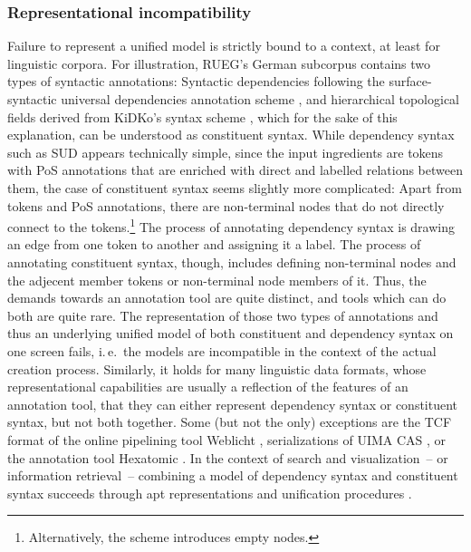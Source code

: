 \documentclass[output=paper,colorlinks,citecolor=brown]{langscibook}
\begin{document}
\subsubsection{Representational incompatibility}

Failure to represent a unified model is strictly bound to a context, at least for linguistic corpora.
For illustration, RUEG's German subcorpus contains two types of syntactic annotations: Syntactic dependencies following the surface-syntactic universal dependencies annotation scheme \parencite[SUD;][]{kahane_annotation_2021}, and hierarchical topological fields derived from KiDKo's syntax scheme \parencite{wiese2010kidko}, which for the sake of this explanation, can be understood as constituent syntax.
While dependency syntax such as SUD appears technically simple, since the input ingredients are tokens with PoS annotations that are enriched with direct and labelled relations between them,
the case of constituent syntax seems slightly more complicated: Apart from tokens and PoS annotations, there are non-terminal nodes that do not directly connect to the tokens.\footnote{Alternatively, the scheme introduces empty nodes.}
The process of annotating dependency syntax is drawing an edge from one token to another and assigning it a label.
The process of annotating constituent syntax, though, includes defining non-terminal nodes and the adjecent member tokens or non-terminal node members of it.
Thus, the demands towards an annotation tool are quite distinct, and tools which can do both are quite rare.
The representation of those two types of annotations and thus an underlying unified model of both constituent and dependency syntax on one screen fails, i.\,e.\ the models are incompatible in the context of the actual creation process.
Similarly, it holds for many linguistic data formats, whose representational capabilities are usually a reflection of the features of an annotation tool, that they can either represent dependency syntax or constituent syntax, but not both together.
Some (but not the only) exceptions are the TCF format of the online pipelining tool Weblicht \parencite{Hinrichs:WebLicht:2010}, serializations of UIMA CAS \parencite{UIMA:UIMAFIT:2009}, or the annotation tool Hexatomic \parencite{hexatomic}.
In the context of search and visualization~-- or information retrieval~-- combining a model of dependency syntax and constituent syntax succeeds through apt representations \parencite{krause_annis:_2019} and unification procedures \parencite{zipser_model_2010,fei2021better,Krause_Annatto_2023}.
\end{document}

